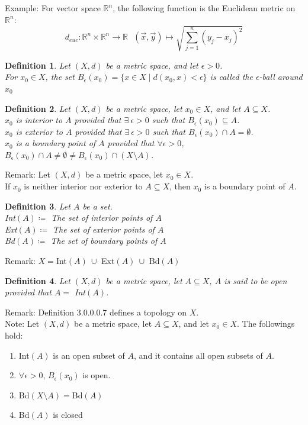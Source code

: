 \documentclass[15pt]{book}
\theoremstyle{break}
\theoremstyle{break}
\newtheorem{defn}{Definition}[corL]
\newcommand{\R}{\mathbb{R}}
\newcommand{\note}{\color{red}Note: \color{black}}
\newcommand{\remark}{\color{blue}Remark: \color{black}}
\newcommand{\example}{\color{green}Example: \color{black}}
\begin{document}
\example For vector space $\R^n$, the following function is the Euclidean metric on $\R^n$: $$d_{euc}:\R^n\times \R^n\to \R \ \ \ (\vec{x},\vec{y}) \mapsto \sqrt{\sum_{j=1}^n(y_j-x_j)^2}$$

\begin{defn}
Let $(X,d)$ be a metric space, and let $\epsilon>0$. \\
For $x_0\in X$, the set $B_\epsilon(x_0) = \{x \in X\mid d(x_0,x)<\epsilon\}$ is called the $\epsilon$-ball around $x_0$
\end{defn}

\begin{defn}
Let $(X,d)$ be a metric space, let $x_0 \in X$, and let $A \subseteq X$.\\ $x_0$ is interior to $A$ provided that $\exists\ \epsilon>0$ such that $B_\epsilon(x_0) \subseteq A$.\\ $x_0$ is exterior to $A$ provided that $\exists\ \epsilon>0$ such that $B_\epsilon(x_0) \cap A = \emptyset$.\\
$x_0$ is a boundary point of $A$ provided that $\forall \epsilon>0$, $B_\epsilon(x_0)\cap A\neq \emptyset \neq B_\epsilon(x_0)\cap (X\setminus A)$.
\end{defn}
\remark Let $(X,d)$ be a metric space, let $x_0 \in X$. \\
If $x_0$ is neither interior nor exterior to $A\subseteq X$, then $x_0$ is a boundary point of $A$. 

\begin{defn}
Let $A$ be a set. \\
Int$(A) \coloneqq $ The set of interior points of $A$\\
Ext$(A) \coloneqq $ The set of exterior points of $A$\\
Bd$(A) \coloneqq $ The set of boundary points of $A$
\end{defn}

\remark $X =$Int$(A)\ \cup $ Ext$(A)\ \cup $ Bd$(A)$

\begin{defn}
Let $(X,d)$ be a metric space, let $A \subseteq X$, $A$ is said to be open provided that $A =$ Int$(A)$.
\end{defn}
\remark Definition 3.0.0.0.7 defines a topology on $X$.\\

\note Let $(X,d)$ be a metric space, let $A \subseteq X$, and let $x_0 \in X$. The followings hold:
\begin{enumerate}[topsep=3pt,itemsep=-1ex,partopsep=1ex,parsep=1ex]
\item Int$(A)$ is an open subset of $A$, and it contains all open subsets of $A$.
\item $\forall \epsilon>0$, $B_\epsilon(x_0)$ is open.
\item Bd$(X\setminus A) =$Bd$(A)$
\item Bd$(A)$ is closed
\end{enumerate}
\end{document}
